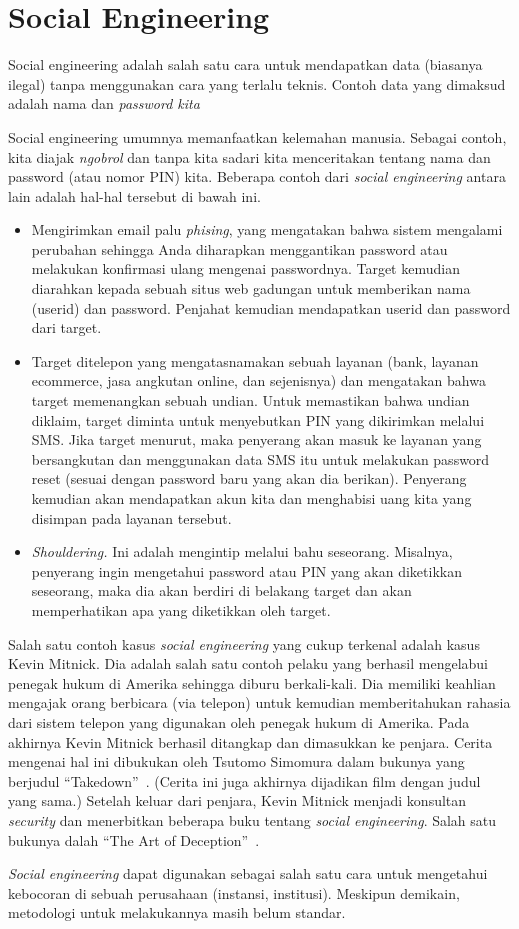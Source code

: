 \chapter{Social Engineering}
Social engineering adalah salah satu cara untuk mendapatkan data
(biasanya ilegal) tanpa menggunakan cara yang terlalu teknis.
Contoh data yang dimaksud adalah nama dan {\em password kita}

Social engineering umumnya memanfaatkan kelemahan manusia.
Sebagai contoh, kita diajak {\em ngobrol} dan tanpa kita sadari
kita menceritakan tentang nama dan password (atau nomor PIN) kita.
Beberapa contoh dari {\em social engineering} antara lain adalah
hal-hal tersebut di bawah ini.

\begin{itemize}
    \item Mengirimkan email palu {\em phising}, yang mengatakan bahwa
    sistem mengalami perubahan sehingga Anda diharapkan menggantikan
    password atau melakukan konfirmasi ulang mengenai passwordnya.
    Target kemudian diarahkan kepada sebuah situs web gadungan
    untuk memberikan nama (userid) dan password. Penjahat kemudian
    mendapatkan userid dan password dari target.
    \item Target ditelepon yang mengatasnamakan sebuah layanan
    (bank, layanan ecommerce, jasa angkutan online, dan sejenisnya)
    dan mengatakan bahwa target memenangkan sebuah undian.
    Untuk memastikan bahwa undian diklaim, target diminta untuk 
    menyebutkan PIN yang dikirimkan melalui SMS. Jika target menurut,
    maka penyerang akan masuk ke layanan yang bersangkutan dan 
    menggunakan data SMS itu untuk melakukan password reset
    (sesuai dengan password baru yang akan dia berikan).
    Penyerang kemudian akan mendapatkan akun kita dan menghabisi
    uang kita yang disimpan pada layanan tersebut.
    \item {\em Shouldering.} Ini adalah mengintip melalui bahu
    seseorang. Misalnya, penyerang ingin mengetahui password atau
    PIN yang akan diketikkan seseorang, maka dia akan berdiri di
    belakang target dan akan memperhatikan apa yang diketikkan oleh
    target.
\end{itemize}

Salah satu contoh kasus {\em social engineering} yang cukup terkenal
adalah kasus Kevin Mitnick. Dia adalah salah satu contoh pelaku
yang berhasil mengelabui penegak hukum di Amerika sehingga diburu
berkali-kali. Dia memiliki keahlian mengajak orang berbicara (via telepon)
untuk kemudian memberitahukan rahasia dari sistem telepon yang digunakan
oleh penegak hukum di Amerika.
Pada akhirnya Kevin Mitnick berhasil ditangkap dan dimasukkan ke penjara.
Cerita mengenai hal ini dibukukan oleh Tsutomo Simomura dalam bukunya
yang berjudul ``Takedown''~\cite{takedown}. (Cerita ini juga akhirnya
dijadikan film dengan judul yang sama.)
Setelah keluar dari penjara, Kevin Mitnick menjadi konsultan
{\em security} dan menerbitkan beberapa buku tentang {\em social engineering}.
Salah satu bukunya dalah ``The Art of Deception''~\cite{mitnickdeception}.

{\em Social engineering} dapat digunakan sebagai salah satu cara
untuk mengetahui kebocoran di sebuah perusahaan (instansi, institusi).
Meskipun demikain, metodologi untuk melakukannya masih belum standar.